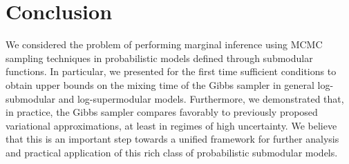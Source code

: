 \section{Conclusion}
We considered the problem of performing marginal inference using MCMC sampling techniques in probabilistic models defined through submodular functions.
In particular, we presented for the first time sufficient conditions to obtain upper bounds on the mixing time of the Gibbs sampler in general log-submodular and log-supermodular models.
Furthermore, we demonstrated that, in practice, the Gibbs sampler compares favorably to previously proposed variational approximations, at least in regimes of high uncertainty.
We believe that this is an important step towards a unified framework for further analysis and practical application of this rich class of probabilistic submodular models.